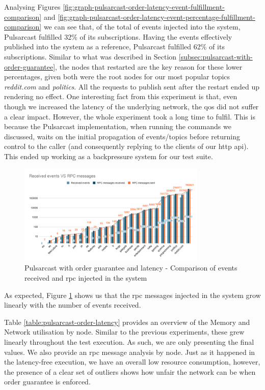 Analysing Figures
\ref{fig:graph-pulsarcast-order-latency-event-fulfillment-comparison} and
\ref{fig:graph-pulsarcast-order-latency-event-percentage-fulfillment-comparison}
we can see that, of the total of events injected into the system, Pulsarcast
fulfilled 32\% of its subscriptions. Having the events effectively published
into the system as a reference, Pulsarcast fulfilled 62\% of its subscriptions.
Similar to what was described in Section
\ref{subsec:pulsarcast-with-order-guarantee}, the nodes that restarted are the
key reason for these lower percentages, given both were the root nodes for our
most popular topics \emph{reddit.com} and \emph{politics}. All the requests to
publish sent after the restart ended up rendering no effect. One interesting
fact from this experiment is that, even though we increased the latency of the
underlying network, the \acrshort{qos} did not suffer a clear impact.  However,
the whole experiment took a long time to fulfil. This is because the Pulsarcast
implementation, when running the commands we discussed, waits on the initial
propagation of events/topics before returning control to the caller (and
consequently replying to the clients of our \acrshort{http} \acrshort{api}).
This ended up working as a backpressure system for our test suite.

\begin{figure}[!htb]
  \centering
  \includegraphics[width=0.8\textwidth]{img/graph-pulsarcast-order-latency-rpc.png}
  \caption{Pulsarcast with order guarantee and latency - Comparison of events received and \acrshort{rpc} injected in the system}
  \label{fig:graph-pulsarcast-order-latency-rpc}
\end{figure}


As expected, Figure \ref{fig:graph-pulsarcast-order-latency-rpc} shows us that
the \acrshort{rpc} messages injected in the system grow linearly with the number of events
received.

Table \ref{table:pulsarcast-order-latency} provides an overview of the Memory
and Network utilisation by node. Similar to the previous experiments, these
grew linearly throughout the test execution. As such, we are only presenting
the final values. We also provide an \acrshort{rpc} message analysis by node. Just as it
happened in the latency-free execution, we have an overall low resource
consumption, however, the presence of a clear set of outliers shows how unfair
the network can be when order guarantee is enforced.

